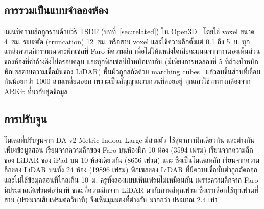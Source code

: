 \subsection{การรวมเป็นแบบจำลองห้อง}\label{sec:fusion}
แผนที่ความลึกถูกรวมด้วยวิธี TSDF (บทที่~\ref{sec:related}) ใน Open3D~\cite{open3d} โดยใช้ voxel ขนาด 4~ซม.
ระยะตัด (truncation) 12~ซม. หรือสาม voxel และใช้ความลึกตั้งแต่ 0.1 ถึง 5~ม.
ทุกแหล่งความลึกรวมเฉพาะพิกเซลที่ Faro มีความลึก เพื่อไม่ให้แหล่งใดเสียคะแนนจากการมองเห็นส่วนของห้องที่ค่าอ้างอิงไม่ครอบคลุม
และทุกพิกเซลมีน้ำหนักเท่ากัน (มีเพียงการทดลองที่ 5 ที่ถ่วงน้ำหนักพิกเซลตามความเชื่อมั่นของ LiDAR)
พื้นผิวถูกสกัดด้วย marching cubes~\cite{marchingcubes} แล้วลบชิ้นส่วนที่เชื่อมกันน้อยกว่า \num{1000} สามเหลี่ยมออก
เพราะเป็นสัญญาณรบกวนที่ลอยอยู่ ทุกแถวใช้ท่าทางกล้องจาก ARKit ที่มากับชุดข้อมูล

\subsection{การปรับจูน}\label{sec:ftsetup}
โมเดลที่ปรับจูนจาก \mbox{DA-v2} Metric-Indoor Large มีสามตัว ใช้สูตรการฝึกเดียวกัน และต่างกันเพียงข้อมูลสอน
\ftfaro{} เรียนจากความลึกของ Faro บนห้องฝึก 10 ห้อง (\num{3594} เฟรม) \ftlidar{} เรียนจากความลึกของ LiDAR ของ iPad
บน 10 ห้องเดียวกัน (\num{8656} เฟรม) และ \ftmain{} ซึ่งเป็นโมเดลหลัก เรียนจากความลึกของ LiDAR บนทั้ง 24 ห้อง
(\num{19896} เฟรม) พิกเซลของ LiDAR ที่มีความเชื่อมั่นต่ำถูกตัดออก และไม่ใช้ข้อมูลสอนที่ไกลเกิน 10~ม.
ครูทั้งสองแบบเห็นเฟรมไม่เหมือนกัน เพราะความลึกจาก Faro มีประมาณสี่เฟรมต่อวินาที ขณะที่ความลึกจาก LiDAR
มากับภาพสีทุกเฟรม ซึ่งเราเลือกใช้ทุกเฟรมที่สาม (ประมาณสิบเฟรมต่อวินาที) \ftlidar{} จึงเห็นมุมมองที่ต่างกัน
มากกว่า \ftfaro{} ประมาณ 2.4 เท่า

